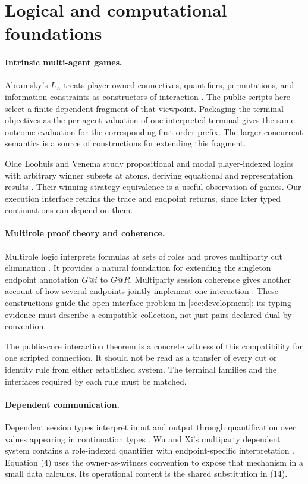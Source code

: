 \section{Logical and computational foundations}
\label{sec:foundations}

\paragraph{Intrinsic multi-agent games.}
Abramsky's $L_A$ treats player-owned connectives, quantifiers, permutations,
and information constraints as constructors of interaction
\cite{Abramsky2007}. The public scripts here select a finite dependent
fragment of that viewpoint. Packaging the terminal objectives as the
per-agent valuation of one interpreted terminal gives the same outcome
evaluation for the corresponding first-order prefix. The larger concurrent
semantics is a source of constructions for extending this fragment.

Olde Loohuis and Venema study propositional and modal player-indexed logics
with arbitrary winner subsets at atoms, deriving equational and representation
results \cite{OldeLoohuisVenema2010}. Their winning-strategy equivalence is a
useful observation of games. Our execution interface retains the trace and
endpoint returns, since later typed continuations can depend on them.

\paragraph{Multirole proof theory and coherence.}
Multirole logic interprets formulas at sets of roles and proves multiparty
cut elimination \cite{XiWu2023}. It provides a natural foundation for extending
the singleton endpoint annotation $G@i$ to $G@R$. Multiparty session
coherence gives another account of how several endpoints jointly implement
one interaction \cite{CarboneEtAl2016}. These constructions guide the open
interface problem in \cref{sec:development}: its typing evidence must describe
a compatible collection, not just pairs declared dual by convention.

The public-core interaction theorem is a concrete witness of this
compatibility for one scripted connection. It should not be read as a
transfer of every cut or identity rule from either established system. The
terminal families and the interfaces required by each rule must be matched.

\paragraph{Dependent communication.}
Dependent session types interpret input and output through quantification
over values appearing in continuation types
\cite{ToninhoCairesPfenning2011}. Wu and Xi's multiparty dependent system
contains a role-indexed quantifier with endpoint-specific interpretation
\cite{WuXi2018}. Equation (4) uses the owner-as-witness convention to expose
that mechanism in a small data calculus. Its operational content is the
shared substitution in (14).

